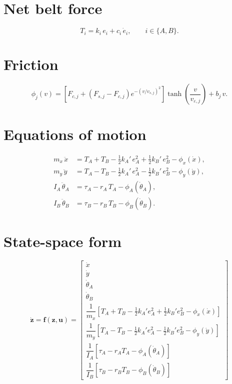 \section*{Net belt force}
\begin{equation}
T_i = k_i\,e_i + c_i\,\dot{e}_i, \qquad i \in \{A, B\}.
\end{equation}

\section*{Friction}
\begin{equation}
\phi_j(v) = \left[ F_{c,j} + \left( F_{s,j} - F_{c,j} \right)
  e^{-\left( v / v_{s,j} \right)^{2}} \right]
  \tanh\!\left( \frac{v}{v_{\varepsilon,j}} \right) + b_j\,v .
\end{equation}

\section*{Equations of motion}
\begin{align}
m_x\,\ddot{x} &= T_A + T_B
  - \tfrac{1}{2} k_A'\,e_A^{2} + \tfrac{1}{2} k_B'\,e_B^{2}
  - \phi_x(\dot{x}), \\
m_y\,\ddot{y} &= T_A - T_B
  - \tfrac{1}{2} k_A'\,e_A^{2} - \tfrac{1}{2} k_B'\,e_B^{2}
  - \phi_y(\dot{y}), \\
I_A\,\ddot{\theta}_A &= \tau_A - r_A\,T_A - \phi_A(\dot{\theta}_A), \\
I_B\,\ddot{\theta}_B &= \tau_B - r_B\,T_B - \phi_B(\dot{\theta}_B).
\end{align}

\section*{State-space form}
\begin{equation}
\dot{\mathbf{z}} = \mathbf{f}(\mathbf{z}, \mathbf{u}) =
\begin{bmatrix}
\dot{x} \\[2pt]
\dot{y} \\[2pt]
\dot{\theta}_A \\[2pt]
\dot{\theta}_B \\[2pt]
\dfrac{1}{m_x} \left[ T_A + T_B - \tfrac{1}{2} k_A' e_A^{2}
  + \tfrac{1}{2} k_B' e_B^{2} - \phi_x(\dot{x}) \right] \\[10pt]
\dfrac{1}{m_y} \left[ T_A - T_B - \tfrac{1}{2} k_A' e_A^{2}
  - \tfrac{1}{2} k_B' e_B^{2} - \phi_y(\dot{y}) \right] \\[10pt]
\dfrac{1}{I_A} \left[ \tau_A - r_A T_A - \phi_A(\dot{\theta}_A) \right] \\[10pt]
\dfrac{1}{I_B} \left[ \tau_B - r_B T_B - \phi_B(\dot{\theta}_B) \right]
\end{bmatrix}
\end{equation}


